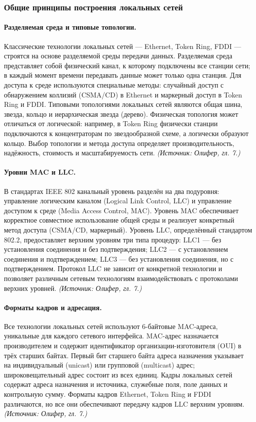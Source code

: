 \documentclass[a4paper,12pt]{article}
\begin{document}
\subsubsection{Общие принципы построения локальных сетей}

\paragraph{Разделяемая среда и типовые топологии.}
Классические технологии локальных сетей — Ethernet, Token Ring, FDDI — строятся на основе разделяемой среды передачи данных. Разделяемая среда представляет собой физический канал, к которому подключены все станции сети; в каждый момент времени передавать данные может только одна станция. Для доступа к среде используются специальные методы: случайный доступ с обнаружением коллизий (CSMA/CD) в Ethernet и маркерный доступ в Token Ring и FDDI. Типовыми топологиями локальных сетей являются общая шина, звезда, кольцо и иерархическая звезда (дерево). Физическая топология может отличаться от логической: например, в Token Ring физически станции подключаются к концентраторам по звездообразной схеме, а логически образуют кольцо. Выбор топологии и метода доступа определяет производительность, надёжность, стоимость и масштабируемость сети.
\textit{(Источник: Олифер, гл. 7.)}

\paragraph{Уровни MAC и LLC.}
В стандартах IEEE 802 канальный уровень разделён на два подуровня: управление логическим каналом (Logical Link Control, LLC) и управление доступом к среде (Media Access Control, MAC). Уровень MAC обеспечивает корректное совместное использование общей среды и реализует конкретный метод доступа (CSMA/CD, маркерный). Уровень LLC, определённый стандартом 802.2, предоставляет верхним уровням три типа процедур: LLC1 — без установления соединения и без подтверждения; LLC2 — с установлением соединения и подтверждением; LLC3 — без установления соединения, но с подтверждением. Протокол LLC не зависит от конкретной технологии и позволяет различным сетевым технологиям взаимодействовать с протоколами верхних уровней.
\textit{(Источник: Олифер, гл. 7.)}

\paragraph{Форматы кадров и адресация.}
Все технологии локальных сетей используют 6-байтовые MAC-адреса, уникальные для каждого сетевого интерфейса. MAC-адрес назначается производителем и содержит идентификатор организации-изготовителя (OUI) в трёх старших байтах. Первый бит старшего байта адреса назначения указывает на индивидуальный (unicast) или групповой (multicast) адрес; широковещательный адрес состоит из всех единиц. Кадры локальных сетей содержат адреса назначения и источника, служебные поля, поле данных и контрольную сумму. Форматы кадров Ethernet, Token Ring и FDDI различаются, но все они обеспечивают передачу кадров LLC верхним уровням.
\textit{(Источник: Олифер, гл. 7.)}
\end{document}
